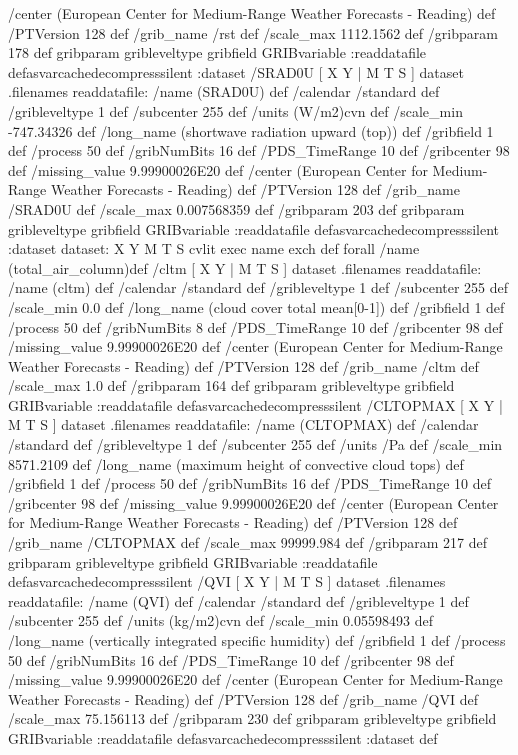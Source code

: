 \begin{ingrid}
{{ /center (European Center for Medium-Range Weather Forecasts - Reading) def
 /PTVersion 128 def
 /grib_name /rst def
 /scale_max 1112.1562 def
 /gribparam 178 def
 gribparam gribleveltype gribfield GRIBvariable
 :readdatafile
}defasvarcachedecompresssilent
:dataset
 /SRAD0U{
[ X Y | M T S ] dataset .filenames readdatafile:
/name (SRAD0U) def
 /calendar /standard def
 /gribleveltype 1 def
 /subcenter 255 def
 /units (W/m2)cvn def
 /scale_min -747.34326 def
 /long_name (shortwave radiation upward (top)) def
 /gribfield 1 def
 /process 50 def
 /gribNumBits 16 def
 /PDS_TimeRange 10 def
 /gribcenter 98 def
 /missing_value 9.99900026E20 def
 /center (European Center for Medium-Range Weather Forecasts - Reading) def
 /PTVersion 128 def
 /grib_name /SRAD0U def
 /scale_max 0.007568359 def
 /gribparam 203 def
 gribparam gribleveltype gribfield GRIBvariable
 :readdatafile
}defasvarcachedecompresssilent
:dataset
dataset:
{ X Y M T S} cvlit { exec name exch def} forall
/name (total_air_column)def
 /cltm{
[ X Y | M T S ] dataset .filenames readdatafile:
/name (cltm) def
 /calendar /standard def
 /gribleveltype 1 def
 /subcenter 255 def
 /scale_min 0.0 def
 /long_name (cloud cover total mean[0-1]) def
 /gribfield 1 def
 /process 50 def
 /gribNumBits 8 def
 /PDS_TimeRange 10 def
 /gribcenter 98 def
 /missing_value 9.99900026E20 def
 /center (European Center for Medium-Range Weather Forecasts - Reading) def
 /PTVersion 128 def
 /grib_name /cltm def
 /scale_max 1.0 def
 /gribparam 164 def
 gribparam gribleveltype gribfield GRIBvariable
 :readdatafile
}defasvarcachedecompresssilent
 /CLTOPMAX{
[ X Y | M T S ] dataset .filenames readdatafile:
/name (CLTOPMAX) def
 /calendar /standard def
 /gribleveltype 1 def
 /subcenter 255 def
 /units /Pa def
 /scale_min 8571.2109 def
 /long_name (maximum height of convective cloud tops) def
 /gribfield 1 def
 /process 50 def
 /gribNumBits 16 def
 /PDS_TimeRange 10 def
 /gribcenter 98 def
 /missing_value 9.99900026E20 def
 /center (European Center for Medium-Range Weather Forecasts - Reading) def
 /PTVersion 128 def
 /grib_name /CLTOPMAX def
 /scale_max 99999.984 def
 /gribparam 217 def
 gribparam gribleveltype gribfield GRIBvariable
 :readdatafile
}defasvarcachedecompresssilent
 /QVI{
[ X Y | M T S ] dataset .filenames readdatafile:
/name (QVI) def
 /calendar /standard def
 /gribleveltype 1 def
 /subcenter 255 def
 /units (kg/m2)cvn def
 /scale_min 0.05598493 def
 /long_name (vertically integrated specific humidity) def
 /gribfield 1 def
 /process 50 def
 /gribNumBits 16 def
 /PDS_TimeRange 10 def
 /gribcenter 98 def
 /missing_value 9.99900026E20 def
 /center (European Center for Medium-Range Weather Forecasts - Reading) def
 /PTVersion 128 def
 /grib_name /QVI def
 /scale_max 75.156113 def
 /gribparam 230 def
 gribparam gribleveltype gribfield GRIBvariable
 :readdatafile
}defasvarcachedecompresssilent
:dataset
} def
\end{ingrid}
